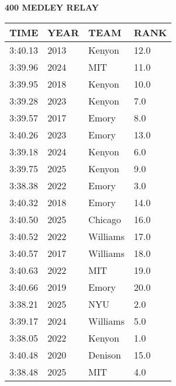 \begin{table}[H]
\centering
\begin{minipage}[t]{0.6\textwidth}
\centering
\textbf{400 MEDLEY RELAY}\\[0.1cm]
\begin{tabular}{@{}p{1.8cm}p{1.2cm}p{1.4cm}p{0.8cm}@{}}
\hline
    \textbf{TIME} & \textbf{YEAR} & \textbf{TEAM} & \textbf{RANK} \\
\hline
    3:40.13 & 2013 & Kenyon & 12.0 \\
    3:39.96 & 2024 & MIT & 11.0 \\
    3:39.95 & 2018 & Kenyon & 10.0 \\
    3:39.28 & 2023 & Kenyon & 7.0 \\
    3:39.57 & 2017 & Emory & 8.0 \\
    3:40.26 & 2023 & Emory & 13.0 \\
    3:39.18 & 2024 & Kenyon & 6.0 \\
    3:39.75 & 2025 & Kenyon & 9.0 \\
    3:38.38 & 2022 & Emory & 3.0 \\
    3:40.32 & 2018 & Emory & 14.0 \\
    3:40.50 & 2025 & Chicago & 16.0 \\
    3:40.52 & 2022 & Williams & 17.0 \\
    3:40.57 & 2017 & Williams & 18.0 \\
    3:40.63 & 2022 & MIT & 19.0 \\
    3:40.66 & 2019 & Emory & 20.0 \\
    3:38.21 & 2025 & NYU & 2.0 \\
    3:39.17 & 2024 & Williams & 5.0 \\
    3:38.05 & 2022 & Kenyon & 1.0 \\
    3:40.48 & 2020 & Denison & 15.0 \\
    3:38.48 & 2025 & MIT & 4.0 \\
\hline
\end{tabular}
\end{minipage}
\end{table}

